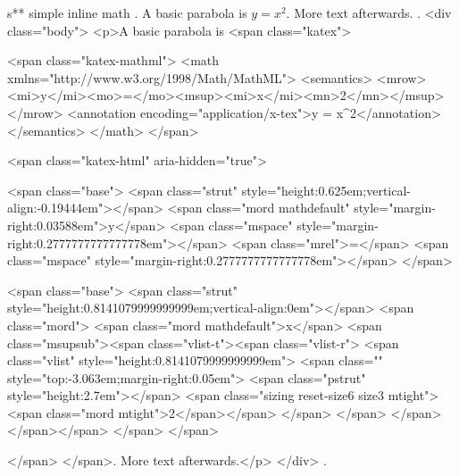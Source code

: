 s** simple inline math
.
A basic parabola is $y = x^2$. More text afterwards.
.
<div class="body">
<p>A basic parabola is <span class="katex">

<span class="katex-mathml">
<math xmlns="http://www.w3.org/1998/Math/MathML">
<semantics>
<mrow><mi>y</mi><mo>=</mo><msup><mi>x</mi><mn>2</mn></msup></mrow>
<annotation encoding="application/x-tex">y = x^2</annotation>
</semantics>
</math>
</span>

<span class="katex-html" aria-hidden="true">

<span class="base">
<span class="strut" style="height:0.625em;vertical-align:-0.19444em"></span>
<span class="mord mathdefault" style="margin-right:0.03588em">y</span>
<span class="mspace" style="margin-right:0.2777777777777778em"></span>
<span class="mrel">=</span>
<span class="mspace" style="margin-right:0.2777777777777778em"></span>
</span>

<span class="base">
<span class="strut" style="height:0.8141079999999999em;vertical-align:0em"></span>
<span class="mord">
<span class="mord mathdefault">x</span>
<span class="msupsub"><span class="vlist-t"><span class="vlist-r">
<span class="vlist" style="height:0.8141079999999999em">
<span class="" style="top:-3.063em;margin-right:0.05em">
<span class="pstrut" style="height:2.7em"></span>
<span class="sizing reset-size6 size3 mtight"><span class="mord mtight">2</span></span>
</span>
</span>
</span></span></span>
</span>
</span>

</span>
</span>. More text afterwards.</p>
</div>
.
